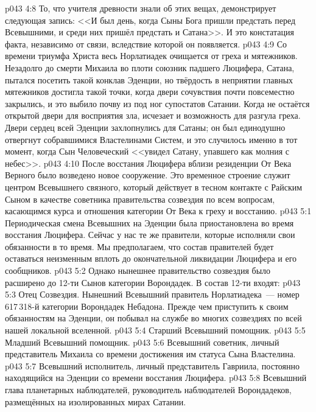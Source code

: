 \vs p043 4:8 То, что учителя древности знали об этих вещах, демонстрирует следующая запись: <<И был день, когда Сыны Бога пришли предстать перед Всевышними, и среди них пришёл предстать и Сатана>>. И это констатация факта, независимо от связи, вследствие которой он появляется.
\vs p043 4:9 \pc Со времени триумфа Христа весь Норлатиадек очищается от греха и мятежников. Незадолго до смерти Михаила во плоти союзник падшего Люцифера, Сатана, пытался посетить такой конклав Эденции, но твёрдость в неприятии главных мятежников достигла такой точки, когда двери сочувствия почти повсеместно закрылись, и это выбило почву из под ног супостатов Сатании. Когда не остаётся открытой двери для восприятия зла, исчезает и возможность для разгула греха. Двери сердец всей Эденции захлопнулись для Сатаны; он был единодушно отвергнут собравшимися Властелинами Систем, и это случилось именно в тот момент, когда Сын Человеческий <<увидел Сатану, упавшего как молния с небес>>.
\vs p043 4:10 После восстания Люцифера вблизи резиденции От Века Верного было возведено новое сооружение. Это временное строение служит центром Всевышнего связного, который действует в тесном контакте с Райским Сыном в качестве советника правительства созвездия по всем вопросам, касающимся курса и отношения категории От Века к греху и восстанию.
\vs p043 5:1 Периодическая смена Всевышних на Эденции была приостановлена во время восстания Люцифера. Сейчас у нас те же правители, которые исполняли свои обязанности в то время. Мы предполагаем, что состав правителей будет оставаться неизменным вплоть до окончательной ликвидации Люцифера и его сообщников.
\vs p043 5:2 Однако нынешнее правительство созвездия было расширено до 12-ти Сынов категории Ворондадек. В состав 12-ти входят:
\vs p043 5:3 Отец Созвездия. Нынешний Всевышний правитель Норлатиадека~--- номер 617\,318-й категории Ворондадек Небадона. Прежде чем приступить к своим обязанностям на Эденции, он побывал на службе во многих созвездиях по всей нашей локальной вселенной.
\vs p043 5:4 Старший Всевышний помощник.
\vs p043 5:5 Младший Всевышний помощник.
\vs p043 5:6 Всевышний советник, личный представитель Михаила со времени достижения им статуса Сына Властелина.
\vs p043 5:7 Всевышний исполнитель, личный представитель Гавриила, постоянно находящийся на Эденции со времени восстания Люцифера.
\vs p043 5:8 Всевышний глава планетарных наблюдателей, руководитель наблюдателей Ворондадеков, размещённых на изолированных мирах Сатании.
